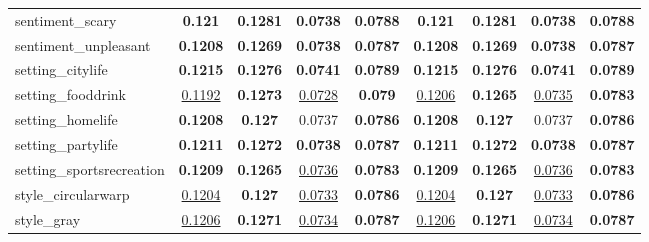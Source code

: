 \begin{center}
\begin{supertabular}{lcccc||cccc}
\small{sentiment\_scary} & \textbf{\scriptsize{0.121}} & \textbf{\scriptsize{0.1281}} & \textbf{\scriptsize{0.0738}} & \textbf{\scriptsize{0.0788}}& \textbf{\scriptsize{0.121}} & \textbf{\scriptsize{0.1281}} & \textbf{\scriptsize{0.0738}} & \textbf{\scriptsize{0.0788}}\\
\small{sentiment\_unpleasant} & \textbf{\scriptsize{0.1208}} & \textbf{\scriptsize{0.1269}} & \textbf{\scriptsize{0.0738}} & \textbf{\scriptsize{0.0787}}& \textbf{\scriptsize{0.1208}} & \textbf{\scriptsize{0.1269}} & \textbf{\scriptsize{0.0738}} & \textbf{\scriptsize{0.0787}}\\
\small{setting\_citylife} & \textbf{\scriptsize{0.1215}} & \textbf{\scriptsize{0.1276}} & \textbf{\scriptsize{0.0741}} & \textbf{\scriptsize{0.0789}}& \textbf{\scriptsize{0.1215}} & \textbf{\scriptsize{0.1276}} & \textbf{\scriptsize{0.0741}} & \textbf{\scriptsize{0.0789}}\\
\small{setting\_fooddrink} & \underline{\scriptsize{0.1192}} & \textbf{\scriptsize{0.1273}} & \underline{\scriptsize{0.0728}} & \textbf{\scriptsize{0.079}}& \underline{\scriptsize{0.1206}} & \textbf{\scriptsize{0.1265}} & \underline{\scriptsize{0.0735}} & \textbf{\scriptsize{0.0783}}\\
\small{setting\_homelife} & \textbf{\scriptsize{0.1208}} & \textbf{\scriptsize{0.127}} & {\scriptsize{0.0737}} & \textbf{\scriptsize{0.0786}}& \textbf{\scriptsize{0.1208}} & \textbf{\scriptsize{0.127}} & {\scriptsize{0.0737}} & \textbf{\scriptsize{0.0786}}\\
\small{setting\_partylife} & \textbf{\scriptsize{0.1211}} & \textbf{\scriptsize{0.1272}} & \textbf{\scriptsize{0.0738}} & \textbf{\scriptsize{0.0787}}& \textbf{\scriptsize{0.1211}} & \textbf{\scriptsize{0.1272}} & \textbf{\scriptsize{0.0738}} & \textbf{\scriptsize{0.0787}}\\
\small{setting\_sportsrecreation} & \textbf{\scriptsize{0.1209}} & \textbf{\scriptsize{0.1265}} & \underline{\scriptsize{0.0736}} & \textbf{\scriptsize{0.0783}}& \textbf{\scriptsize{0.1209}} & \textbf{\scriptsize{0.1265}} & \underline{\scriptsize{0.0736}} & \textbf{\scriptsize{0.0783}}\\
\small{style\_circularwarp} & \underline{\scriptsize{0.1204}} & \textbf{\scriptsize{0.127}} & \underline{\scriptsize{0.0733}} & \textbf{\scriptsize{0.0786}}& \underline{\scriptsize{0.1204}} & \textbf{\scriptsize{0.127}} & \underline{\scriptsize{0.0733}} & \textbf{\scriptsize{0.0786}}\\
\small{style\_gray} & \underline{{\scriptsize{0.1206}}} & \textbf{{\scriptsize{0.1271}}} & \underline{{\scriptsize{0.0734}}} & \textbf{{\scriptsize{0.0787}}}& \underline{{\scriptsize{0.1206}}} & \textbf{{\scriptsize{0.1271}}} & \underline{{\scriptsize{0.0734}}} & \textbf{{\scriptsize{0.0787}}}\\

\end{supertabular}
\end{center}
